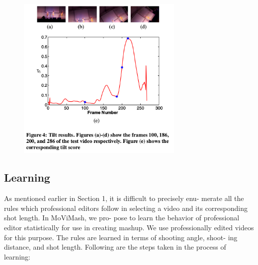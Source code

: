 \documentclass{sig-alternate}
\begin{document}
\begin{figure}
\centering
\includegraphics[height = 8cm,width=8cm]{fig4.png}
\end{figure}

\subsection{Learning}

As mentioned earlier in Section 1, it is difficult to precisely enu-
merate all the rules which professional editors follow in selecting
a video and its corresponding shot length. In MoViMash, we pro-
pose to learn the behavior of professional editor statistically for use
in creating mashup. We use professionally edited videos for this
purpose. The rules are learned in terms of shooting angle, shoot-
ing distance, and shot length. Following are the steps taken in the
process of learning:
\end{document}

